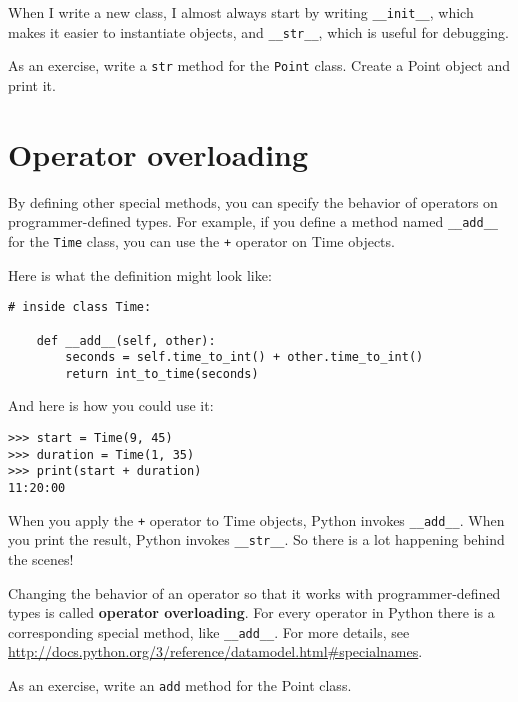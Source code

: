 %
When I write a new class, I almost always start by writing
\verb"__init__", which makes it easier to instantiate objects, and
\verb"__str__", which is useful for debugging.

As an exercise, write a {\tt str} method for the {\tt Point} class.
Create a Point object and print it.


\section{Operator overloading}
\label{operator.overloading}

By defining other special methods, you can specify the behavior
of operators on programmer-defined types.  For example, if you define
a method named \verb"__add__" for the {\tt Time} class, you can use the
{\tt +} operator on Time objects.

Here is what the definition might look like:

\begin{lstlisting}
# inside class Time:

    def __add__(self, other):
        seconds = self.time_to_int() + other.time_to_int()
        return int_to_time(seconds)
\end{lstlisting}

%
And here is how you could use it:

\begin{lstlisting}
>>> start = Time(9, 45)
>>> duration = Time(1, 35)
>>> print(start + duration)
11:20:00
\end{lstlisting}

%
When you apply the {\tt +} operator to Time objects, Python invokes
\verb"__add__".  When you print the result, Python invokes
\verb"__str__".  So there is a lot happening behind the scenes!

Changing the behavior of an operator so that it works with
programmer-defined types is called {\bf operator overloading}.  For every
operator in Python there is a corresponding special method, like
\verb"__add__".  For more details, see
\url{http://docs.python.org/3/reference/datamodel.html#specialnames}.

As an exercise, write an {\tt add} method for the Point class.


